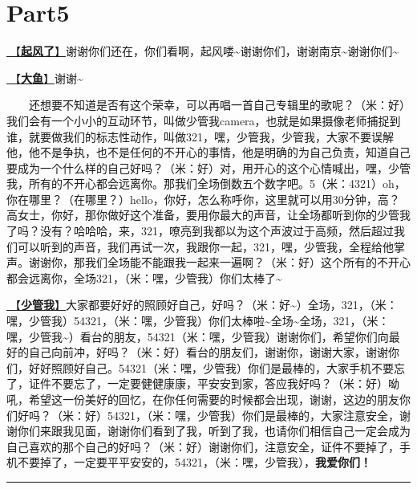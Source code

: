 \documentclass[]{ctexbook}
\begin{document}
\section{Part5}\label{nanjing-20240811-part5}

\hyperref[the-wind-rises]{🎵【\textbf{起风了}】}谢谢你们还在，你们看啊，起风喽\textasciitilde 谢谢你们，谢谢南京\textasciitilde 谢谢你们\textasciitilde{}

\hyperref[big-fish]{🎵【\textbf{大鱼}】}谢谢\textasciitilde{}

  还想要不知道是否有这个荣幸，可以再唱一首自己专辑里的歌呢？（米：好）我们会有一个小小的互动环节，叫做少管我camera，也就是如果摄像老师捕捉到谁，就要做我们的标志性动作，叫做321，嘿，少管我，少管我，大家不要误解他，他不是争执，也不是任何的不开心的事情，他是明确的为自己负责，知道自己要成为一个什么样的自己好吗？（米：好）对，用开心的这个心情喊出，嘿，少管我，所有的不开心都会远离你。那我们全场倒数五个数字吧。5（米：4321）oh，你在哪里？（在哪里？）hello，你好，怎么称呼你，这里就可以用30分钟，高？高女士，你好，那你做好这个准备，要用你最大的声音，让全场都听到你的少管我了吗？没有？哈哈哈，来，321，嘹亮到我都以为这个声波过于高频，然后超过我们可以听到的声音，我们再试一次，我跟你一起，321，嘿，少管我，全程给他掌声。谢谢你，那我们全场能不能跟我一起来一遍啊？（米：好）这个所有的不开心都会远离你，全场321，（米：嘿，少管我）你们太棒了\textasciitilde{}

\hyperref[watch-ur-manners]{🎵【\textbf{少管我}】}大家都要好好的照顾好自己，好吗？（米：好\textasciitilde）全场，321，（米：嘿，少管我）54321，（米：嘿，少管我）你们太棒啦\textasciitilde 全场\textasciitilde 全场，321，（米：嘿，少管我\textasciitilde）看台的朋友，54321（米：嘿，少管我）谢谢你们，希望你们向最好的自己向前冲，好吗？（米：好）看台的朋友们，谢谢你，谢谢大家，谢谢你们，好好照顾好自己。54321（米：嘿，少管我）你们是最棒的，大家手机不要忘了，证件不要忘了，一定要健健康康，平安安到家，答应我好吗？（米：好）呦吼，希望这一份美好的回忆，在你任何需要的时候都会出现，谢谢，这边的朋友你们好吗？（米：好）54321，（米：嘿，少管我）你们是最棒的，大家注意安全，谢谢你们来跟我见面，谢谢你们看到了我，听到了我，也请你们相信自己一定会成为自己喜欢的那个自己的好吗？（米：好）谢谢你们，注意安全，证件不要掉了，手机不要掉了，一定要平平安安的，54321，（米：嘿，少管我），\textbf{我爱你们！}

\begin{center}\rule{0.5\linewidth}{0.5pt}\end{center}
\end{document}
